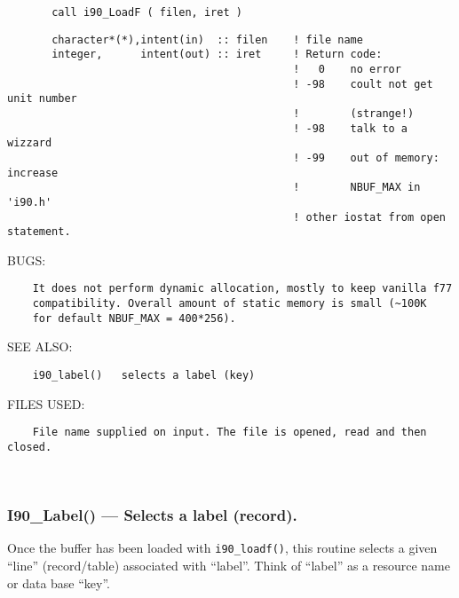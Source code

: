 \begin{verbatim}       call i90_LoadF ( filen, iret )\end{verbatim}
\begin{verbatim}
       character*(*),intent(in)  :: filen    ! file name
       integer,      intent(out) :: iret     ! Return code:
                                             !   0    no error
                                             ! -98    coult not get unit number
                                             !        (strange!)
                                             ! -98    talk to a wizzard
                                             ! -99    out of memory: increase
                                             !        NBUF_MAX in 'i90.h'
                                             ! other iostat from open statement.
\end{verbatim}
{\sf BUGS:}
\begin{verbatim}    It does not perform dynamic allocation, mostly to keep vanilla f77
    compatibility. Overall amount of static memory is small (~100K
    for default NBUF_MAX = 400*256).\end{verbatim}{\sf SEE ALSO:}
\begin{verbatim}    i90_label()   selects a label (key)\end{verbatim}{\sf FILES USED:}
\begin{verbatim}    File name supplied on input. The file is opened, read and then closed.\end{verbatim}%
 
 
\mbox{}\hrulefill\ 

  \subsubsection{I90\_Label() --- Selects a label (record). }

    Once the buffer has been loaded with {\tt i90\_loadf()}, this routine
    selects a given ``line'' (record/table) associated with ``label''. 
    Think of ``label'' as a resource name or data base ``key''.
  
